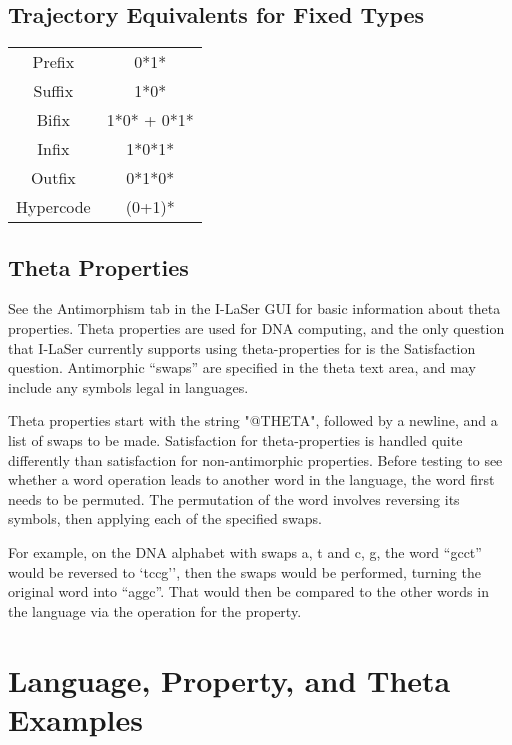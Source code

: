 \documentclass{article}
\begin{document}
\subsection{Trajectory Equivalents for Fixed Types}
\begin{center}
\begin{tabular}{c c}
Prefix & 0*1*\\
Suffix & 1*0*\\
Bifix & 1*0* + 0*1*\\
Infix & 1*0*1*\\
Outfix & 0*1*0*\\
Hypercode & (0+1)*
\end{tabular}
\end{center}

\subsection{Theta Properties}
See the Antimorphism tab in the I-LaSer GUI for basic information about theta properties.
Theta properties are used for DNA computing, and the only question that I-LaSer currently supports using theta-properties for is the Satisfaction question.
Antimorphic ``swaps'' are specified in the theta text area, and may include any symbols legal in languages.

Theta properties start with the string "@THETA", followed by a newline, and a list of swaps to be made. 
Satisfaction for theta-properties is handled quite differently than satisfaction for non-antimorphic properties.
Before testing to see whether a word operation leads to another word in the language, the word first needs to be permuted.
The permutation of the word involves reversing its symbols, then applying each of the specified swaps. 

For example, on the DNA alphabet with swaps {a, t} and {c, g}, the word ``gcct'' would be reversed to `tccg'', then the swaps would be performed, turning the original word into ``aggc''.
That would then be compared to the other words in the language via the operation for the property.
\pagebreak
\section{Language, Property, and Theta Examples}
\end{document}
